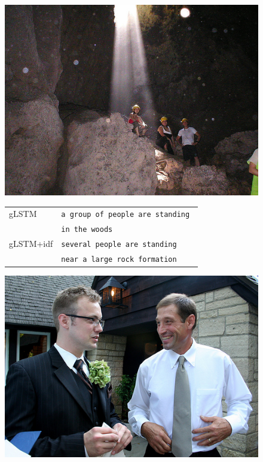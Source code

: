 \begin{figure}
	\centering
	\begin{minipage}[t]{.3\textwidth}
		\centering
		\vspace{0pt}
		\includegraphics[width=\textwidth]{Images/Results/idf/rock}
	\end{minipage}\hfill	
	\begin{minipage}[t]{.7\textwidth}
		\vspace{0pt}
		\begin{tabular}{ll}
			gLSTM & \texttt{a group of people are standing } \\
			~ & \texttt{in the woods} \\
			gLSTM+idf & \texttt{several people are standing}\\
			~ & \texttt{near a large rock formation} \\
		\end{tabular}
	\end{minipage}
	\centering
	\begin{minipage}[t]{.3\textwidth}
		\centering
		\vspace{0pt}
		\includegraphics[width=\textwidth]{Images/Results/idf/trouw}

\end{minipage}
\end{figure}
